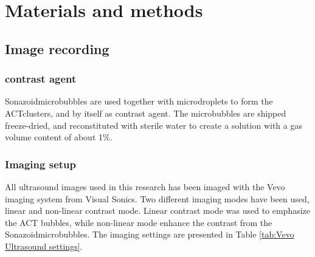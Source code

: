 \section{Materials and methods}
\subsection{Image recording}
\subsubsection{contrast agent}
Sonazoid\texttrademark microbubbles are used together with microdroplets to form the ACT\texttrademark clusters, and by itself as contrast agent. The microbubbles are shipped freeze-dried, and reconstituted with sterile water to create a solution with a gas volume content of about 1\%. %

\subsubsection{Imaging setup}
All ultrasound images used in this research has been imaged with the Vevo imaging system from Visual Sonics.
Two different imaging modes have been used, linear and non-linear contrast mode. Linear contrast mode was used to emphasize the ACT bubbles, while non-linear mode enhance the contrast from the Sonazoid\texttrademark microbubbles. The imaging settings are presented in Table \ref{tab:Vevo Ultrasound settings}.

